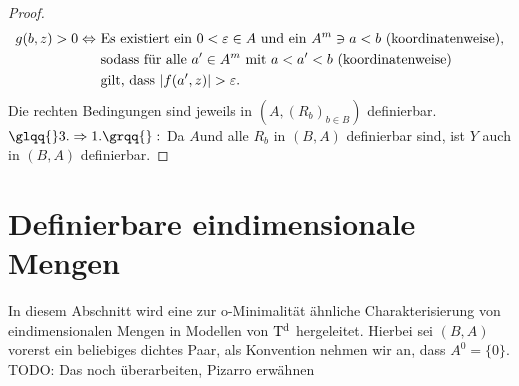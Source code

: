 \begin{proof}
\begin{align*}
	g(b,z)>0\Leftrightarrow\ &\text{Es existiert ein }0<\varepsilon\in A\text{ und ein }A^m\ni a<b\text{ (koordinatenweise),}\\&\text{sodass für alle }a'\in A^m\text{ mit }a<a'<b\text{ (koordinatenweise)}\\&\text{gilt, dass }{\left| f(a',z) \right|}>\varepsilon.
	\end{align*}
	Die rechten Bedingungen sind jeweils in $(A,(R_b)_{b\in B})$ definierbar.\\
	$\glqq{}3.\Rightarrow 1.\grqq{}:$ Da $A$und alle $R_b$ in $(B,A)$ definierbar sind, ist $Y$ auch in $(B,A)$ definierbar.
\end{proof}

\section{Definierbare eindimensionale Mengen}
In diesem Abschnitt wird eine zur o-Minimalität ähnliche Charakterisierung von eindimensionalen Mengen in Modellen von $\operatorname{T^d}$ hergeleitet. Hierbei sei $(B,A)$ vorerst ein beliebiges dichtes Paar, als Konvention nehmen wir an, dass $A^0=\{0\}$.
TODO: Das noch überarbeiten, Pizarro erwähnen

